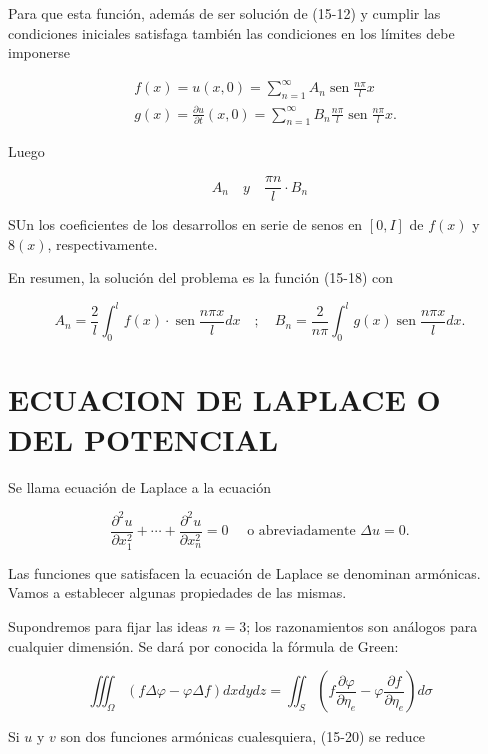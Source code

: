 \documentclass[10pt]{article}
\theoremstyle{plain}
\theoremstyle{definition}
\theoremstyle{remark}
\begin{document}
Para que esta función, además de ser solución de (15-12) y cumplir las condiciones iniciales satisfaga también las condiciones en los límites debe imponerse

$$
\begin{aligned}
& f(x)=u(x, 0)=\sum_{n=1}^{\infty} A_{n} \operatorname{sen} \frac{n \pi}{l} x \\
& g(x)=\frac{\partial u}{\partial t}(x, 0)=\sum_{n=1}^{\infty} B_{n} \frac{n \pi}{l} \operatorname{sen} \frac{n \pi}{l} x .
\end{aligned}
$$

Luego

$$
A_{n} \quad y \quad \frac{\pi n}{l} \cdot B_{n}
$$

SUn los coeficientes de los desarrollos en serie de senos en $[0, I]$ de $f(x)$ y $8(x)$, respectivamente.

En resumen, la solución del problema es la función (15-18) con

$$
A_{n}=\frac{2}{l} \int_{0}^{l} f(x) \cdot \operatorname{sen} \frac{n \pi x}{l} d x \quad ; \quad B_{n}=\frac{2}{n \pi} \int_{0}^{l} g(x) \operatorname{sen} \frac{n \pi x}{l} d x .
$$

\section*{ECUACION DE LAPLACE O DEL POTENCIAL}
Se llama ecuación de Laplace a la ecuación


\begin{equation*}
\frac{\partial^{2} u}{\partial x_{1}^{2}}+\cdots+\frac{\partial^{2} u}{\partial x_{n}^{2}}=0 \quad \text { o abreviadamente } \Delta u=0 . \tag{15-19}
\end{equation*}


Las funciones que satisfacen la ecuación de Laplace se denominan armónicas. Vamos a establecer algunas propiedades de las mismas.

Supondremos para fijar las ideas $n=3$; los razonamientos son análogos para cualquier dimensión. Se dará por conocida la fórmula de Green:


\begin{equation*}
\iiint_{\Omega}(f \Delta \varphi-\varphi \Delta f) d x d y d z=\iint_{S}\left(f \frac{\partial \varphi}{\partial \eta_{e}}-\varphi \frac{\partial f}{\partial \eta_{e}}\right) d \sigma \tag{15-20}
\end{equation*}


Si $u$ y $v$ son dos funciones armónicas cualesquiera, (15-20) se reduce
\end{document}
